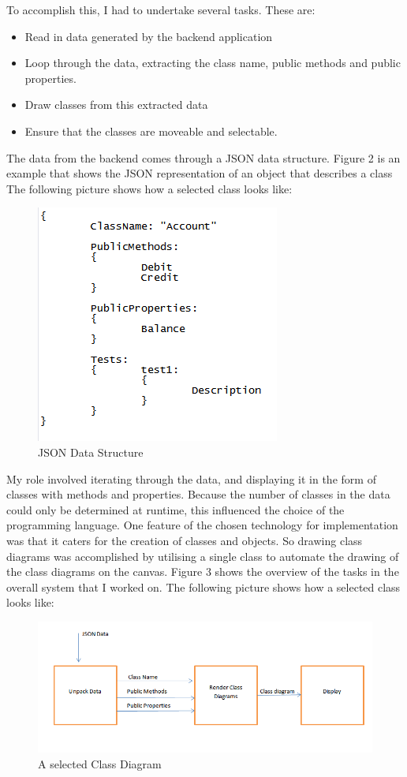 \documentclass[a4paper,12pt]{article}
\begin{document}
To accomplish this, I had to undertake several tasks. These are:
\begin{itemize}
\item Read in data generated by the backend application
\item Loop through the data, extracting the class name, public methods and public properties.
\item Draw classes from this extracted data
\item Ensure that the classes are moveable and selectable.
\end{itemize}
The data from the backend comes through a JSON data structure. Figure 2 is an example that shows the JSON representation of an object that describes a class
\indent The following picture shows how a selected class looks like: 
\begin{figure} [H]
\includegraphics[scale=0.8] {capture1.png}
\caption{JSON Data Structure}
\label{mdp}
\end{figure}

\indent My role involved iterating through the data, and displaying it in the form of classes with methods and properties. Because the number of classes in the data could only be determined at runtime, this influenced the choice of the programming language. One feature of the chosen technology for implementation was that it caters for the creation of classes and objects. So drawing class diagrams was accomplished by utilising a single class to automate the drawing of the class diagrams on the canvas. Figure 3 shows the overview of the tasks in the overall system that I worked on.
\indent The following picture shows how a selected class looks like: 
\begin{figure} [H]
\includegraphics[scale=0.8] {design.png}
\caption{A selected Class Diagram}
\label{mdp}
\end{figure}
\end{document}

